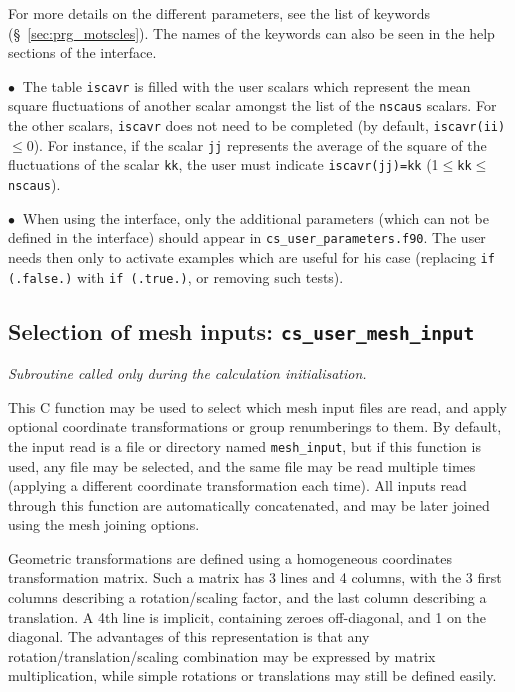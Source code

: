 {{For more details on the different parameters, see the list of keywords
(\S~\ref{sec:prg_motscles}).
 The names of the keywords can also be seen in the help sections of the interface.

$\bullet\ $ The table \texttt{iscavr} is filled with the user scalars which represent the mean square fluctuations of another scalar amongst the list of the \texttt{nscaus} scalars. For the other scalars, \texttt{iscavr} does not need to be completed (by default,
\texttt{iscavr(ii)}$\leqslant$0). For instance, if the scalar \texttt{jj}
represents the average of the square of the fluctuations of the scalar \texttt{kk},
the user must indicate \texttt{iscavr(jj)=kk}
(1$\leqslant$\texttt{kk}$\leqslant$\texttt{nscaus}).

\noindent
$\bullet\ $ When using the interface, only the
additional parameters (which can not be defined in the interface)
should appear in \texttt{cs\_user\_parameters.f90}. The user
needs then only to activate examples which are useful for his
case (replacing \texttt{if (.false.)} with \texttt{if (.true.)},
or removing such tests).

\subsection{Selection of mesh inputs: \textmd{\texttt{cs\_user\_mesh\_input}}}

\noindent
\textit{Subroutine called only during the calculation initialisation.}

This C function may be used to select which mesh input files
are read, and apply optional coordinate transformations or group renumberings
to them. By default, the input read is a file or directory named
\texttt{mesh\_input}, but if this function is used, any file may be selected,
and the same file may be read multiple times (applying a different
coordinate transformation each time).
All inputs read through this function are automatically concatenated, and
may be later joined using the mesh joining options.

Geometric transformations are defined using a homogeneous coordinates
transformation matrix. Such a matrix has 3 lines and 4 columns, with the
3 first columns describing a rotation/scaling factor, and the last column
describing a translation. A 4th line is implicit, containing zeroes
off-diagonal, and 1 on the diagonal. The advantages of this representation
is that any rotation/translation/scaling combination may be expressed
by matrix multiplication, while simple rotations or translations
may still be defined easily.

}}
